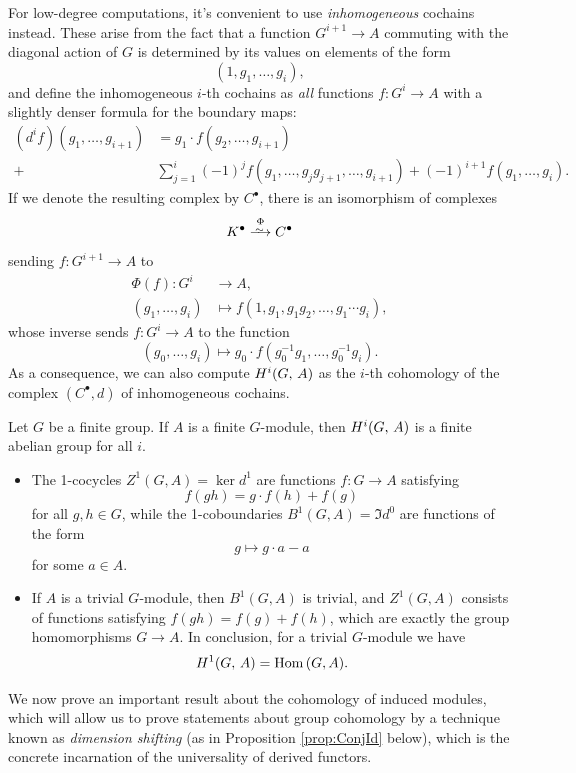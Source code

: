 \documentclass[a4paper, oneside]{memoir}
\begin{document}
For low-degree computations, it's convenient to use \textit{inhomogeneous} cochains instead. These arise from the fact that a function $G^{i+1}\to A$ commuting with the diagonal action of $G$ is determined by its values on elements of the form \[(1,g_1,\dots , g_i),\] and define the inhomogeneous $i$-th cochains as \textit{all} functions $f: G^i\to A$ with a slightly denser formula for the boundary maps:
\begin{equation}\label{eq:Coboundary}
	\begin{aligned}
		(d^i f)(g_1,\dots , g_{i+1}) & =g_1\cdot f(g_2,\dots , g_{i+1})                                                                \\
		+                            & \sum_{j=1}^{i} (-1)^j f(g_1,\dots , g_j g_{j+1},\dots , g_{i+1})+(-1)^{i+1} f(g_1,\dots , g_i).
	\end{aligned}
\end{equation}
If we denote the resulting complex by $C^\bullet$, there is an isomorphism of complexes
\[
	K^\bullet\overset{\Phi}{\Iso} C^\bullet
\]
sending $f: G^{i+1}\to A$ to
\begin{align*}
	\Phi(f): G^i      & \to A,                                            \\
	(g_1,\dots , g_i) & \mapsto f(1,g_1, g_1 g_2, \dots , g_1\cdots g_i),
\end{align*}
whose inverse sends $f: G^i\to A$ to the function
\[
	(g_0,\dots , g_i)\mapsto g_0\cdot f(g_0^{-1}g_1,\dots , g_0^{-1}g_i).
\]
As a consequence, we can also compute $H^{i}( G, \, A )$ as the $i$-th cohomology of the complex $(C^\bullet, d)$ of inhomogeneous cochains.

\begin{corollary}
	Let $G$ be a finite group. If $A$ is a finite $G$-module, then $H^{i}( G, \, A )$ is a finite abelian group for all $i$.
\end{corollary}
\begin{example}
	\noindent
	\begin{itemize}
		\item The 1-cocycles $Z^1(G,A)=\ker{d^1}$ are functions $f: G\to A$ satisfying $$f(gh)=g\cdot f(h)+f(g)$$ for all $g,h\in G$, while the 1-coboundaries $B^1(G,A)=\Im{d^0}$ are functions of the form $$g\mapsto g\cdot a-a$$ for some $a\in A$.
		\item\label{ex:TrivialModH1} If $A$ is a trivial $G$-module, then $B^1(G,A)$ is trivial, and $Z^1(G,A)$ consists of functions satisfying $f(gh)=f(g)+f(h)$, which are exactly the group homomorphisms $G\to A$. In conclusion, for a trivial $G$-module we have \[H^{1}( G, \, A )=\operatorname{Hom}{(G,A)}.\]
	\end{itemize}
\end{example}
We now prove an important result about the cohomology of induced modules, which will allow us to prove statements about group cohomology by a technique known as \textit{dimension
	shifting} (as in Proposition \ref{prop:ConjId} below), which is the concrete incarnation of the universality of derived functors.
\end{document}
